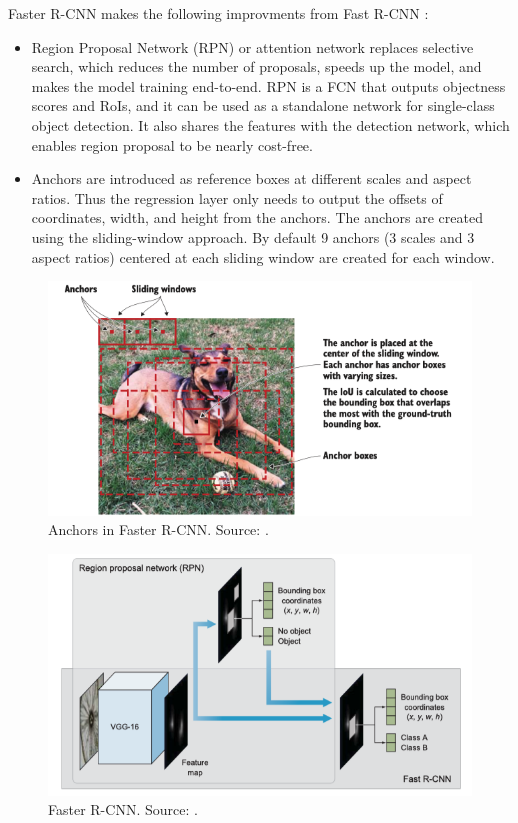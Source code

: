 \documentclass[a4paper, 11pt, oneside]{article}
\begin{document}
  Faster R-CNN makes the following improvments from Fast R-CNN \cite{elgendy2020deep, ren2015faster}:

  \begin{itemize}
    \item Region Proposal Network (RPN) or attention network replaces selective search, which reduces the number of
    proposals, speeds up the model, and makes the model training end-to-end. RPN is a FCN that outputs objectness scores
    and RoIs, and it can be used as a standalone network for single-class object detection. It also shares the features
    with the detection network, which enables region proposal to be nearly cost-free.
    \item Anchors are introduced as reference boxes at different scales and aspect ratios. Thus the regression layer
    only needs to output the offsets of coordinates, width, and height from the anchors. The anchors are created using
    the sliding-window approach. By default 9 anchors (3 scales and 3 aspect ratios) centered at each sliding window are
    created for each window.
  \end{itemize}

  \begin{figure}[ht]
    \begin{center}
      \includegraphics[width=.8\textwidth]{anchors.png}
    \end{center}
    \caption{Anchors in Faster R-CNN. Source: \cite{elgendy2020deep}.}
  \end{figure}

  \begin{figure}[ht]
    \begin{center}
      \includegraphics[width=.8\textwidth]{faster_r_cnn.png}
    \end{center}
    \caption{Faster R-CNN. Source: \cite{elgendy2020deep}.}
  \end{figure}
\end{document}
